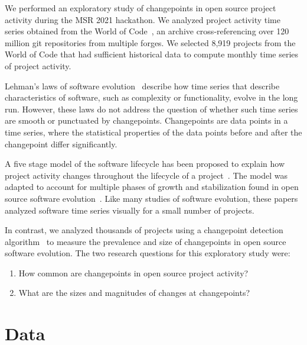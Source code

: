 \documentclass[10pt,conference]{IEEEtran}
\begin{document}
We performed an exploratory study of changepoints in open source project activity during the MSR 2021 hackathon. We analyzed project activity time series obtained from the World of Code~\cite{ma2019world}, an archive cross-referencing over 120 million git repositories from multiple forges. We selected 8,919 projects from the World of Code that had sufficient historical data to compute monthly time series of project activity.

Lehman's laws of software evolution~\cite{lehman1996laws} describe how time series that describe characteristics of software, such as complexity or functionality, evolve in the long run. However, these laws do not address the question of whether such time series are smooth or punctuated by changepoints. Changepoints are data points in a time series, where the statistical properties of the data points before and after the changepoint differ significantly. 

A five stage model of the software lifecycle has been proposed to explain how project activity changes throughout the lifecycle of a project~\cite{rajlich2000staged}. The model was adapted to account for multiple phases of growth and stabilization found in open source software evolution~\cite{capiluppi2007adapting}. Like many studies of software evolution, these papers analyzed software time series visually for a small number of projects.


In contrast, we analyzed thousands of projects using a changepoint detection algorithm~\cite{van2020evaluation} to measure the prevalence and size of changepoints in open source software evolution. The two research questions for this exploratory study were:
\begin{enumerate}
    \item How common are changepoints in open source project activity?
    \item What are the sizes and magnitudes of changes at changepoints?
\end{enumerate}

\section{Data}
\end{document}
